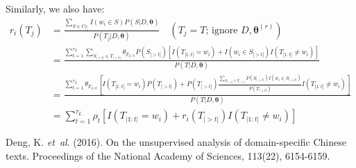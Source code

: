 \documentclass[12pt]{article}
\begin{document}
Similarly, we also have:
\begin{align*}
r_i(T_j) &= \frac{\sum_{S \in C_{T_j}} I(w_i \in S)P(S|D, \bm{\theta})}{P(T_j|D, \bm{\theta})} \quad (T_j = T \text{; ignore } D, \bm{\theta}^{(r)}) \\
&= \frac{\sum_{t=1}^{\tau_L} \sum_{S_{|>t|} \in T_{|>t|}} \theta_{T_{|1:t|}}P(S_{|>t|}) [I(T_{|1:t|} = w_i) + I(w_i \in S_{|>t|})I(T_{|1:t|} \neq w_i)]}{P(T|D, \bm{\theta})} \\
&= \frac{\sum_{t=1}^{\tau_L} \theta_{T_{|1:t|}} [I(T_{|1:t|} = w_i) P(T_{|>t|}) + P(T_{|>t|}) \frac{\sum_{S_{|>t|} \in T_{|>t|}} P(S_{|>t|}) I(w_i \in S_{|>t|})}{P(T_{|>t|})} I(T_{|1:t|} \neq w_i)]}{P(T|D, \bm{\theta})} \\
&= \sum_{t=1}^{\tau_L} \rho_t [I(T_{|1:t|} = w_i) + r_i(T_{|>t|})I(T_{|1:t|} \neq w_i)]
\end{align*}


%
%

\begin{thebibliography}{}

Deng, K. \textit{et~al}. (2016). On the unsupervised analysis of domain-specific Chinese texts. Proceedings of the National Academy of Sciences, 113(22), 6154-6159.

\end{thebibliography}
\end{document}
